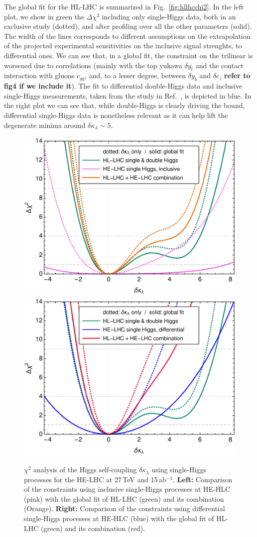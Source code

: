 The global fit for the HL-LHC is summarized in Fig.~\ref{fig:hllhcchi2}. In the left plot, we show in green the $\Delta\chi^2$ including only single-Higgs data, both in an exclusive study (dotted), and after profiling over all the other parameters (solid). The width of the lines corresponds to different assumptions on the extrapolation of the projected experimental sensitivities on the inclusive signal strenghts, to differential ones. We can see that, in a global fit, the constraint on the trilinear is worsened due to correlations (mainly with the top yukawa $\delta y_t$ and the contact interaction with gluons $c_{gg}$, and, to a lesser degree, between $\delta y_b$ and $\delta c_z$ \textbf{refer to fig4 if we include it}). The fit to differential double-Higgs data and inclusive single-Higgs measurements, taken from the study in Ref.~\cite{Azatov:2015oxa}, is depicted in blue. In the right plot we can see that, while double-Higgs is clearly driving the bound, differential single-Higgs data is nonetheless relevant as it can help lift the degenerate minima around $\delta \kappa_\lambda\sim 5$.
\medskip


\begin{figure}
	\centering
	\includegraphics[width=0.45\linewidth]{section3/plots/helhcinc}\hfill
	\includegraphics[width=0.45\linewidth]{section3/plots/helhcdiff}
	\caption{$\chi^2$ analysis of the Higgs self-coupling $\delta \kappa_\lambda$ using single-Higgs processes for the HE-LHC at 27\,TeV and 15\,ab$^{-1}$. \textbf{Left:} Comparison of the constraints using inclusive single-Higgs processes at HE-HLC (pink) with the global fit of HL-LHC (green) and its combination (Orange). \textbf{Right:} Comparison of the constraints using differential single-Higgs processes at HE-HLC (blue) with the global fit of HL-LHC (green) and its combination (red).}
	\label{fig:helhcchi2}
\end{figure}	


